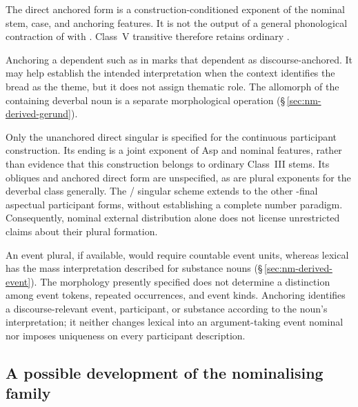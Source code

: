 \label{sec:nm-def-contraction}
The direct anchored  form is a construction-conditioned
exponent of the nominal stem, case, and anchoring features. It is not the
output of a general phonological contraction of  with .
Class~V transitive  therefore retains ordinary .

Anchoring a dependent such as  in
 marks that dependent as discourse-anchored.
It may help establish the intended interpretation when the context identifies
the bread as the theme, but it does not assign thematic role. The 
allomorph of the containing deverbal noun is a separate morphological
operation (§\,\ref{sec:nm-derived-gerund}).

Only the unanchored direct singular  
is specified for the continuous participant construction. Its ending  is a joint exponent of Asp and nominal
features, rather than evidence that this construction belongs to ordinary
Class~III  stems. Its obliques and anchored direct form are
unspecified, as are plural exponents for the deverbal class generally. The
/ singular scheme extends to the other
-final aspectual participant forms, without establishing a complete
number paradigm. Consequently, nominal external distribution alone does not
license unrestricted claims about their plural formation.

An event plural, if available, would require countable event units, whereas
lexical  has the mass interpretation described for substance nouns
(§\,\ref{sec:nm-derived-event}). The morphology presently specified does not
determine a distinction among event tokens, repeated occurrences, and event
kinds. Anchoring identifies a discourse-relevant event, participant, or
substance according to the noun's interpretation; it neither changes lexical
 into an argument-taking event nominal nor imposes uniqueness on
every participant description.

\subsection{A possible development of the nominalising family}
\label{sec:nm-derived-history}

